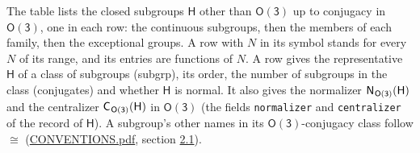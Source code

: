 \documentclass[10pt,a4paper]{article}
\numberwithin{equation}{section}
\newcommand{\grp}[1]{\mathsf{#1}}
\newcommand{\samecls}{\cong}
\newcommand{\hairsp}{\mkern1mu}
\begin{document}
\leavevmode\label{n:group.H}The table lists the closed subgroups $\grp{H}$ other than $\grp{O(3)}$ up to conjugacy in $\grp{O(3)}$, one in each row: the continuous subgroups, then the members of each family, then the exceptional groups. A row with $N$ in its symbol stands for every $N$ of its range, and its entries are functions of $N$. \label{n:head.subgroup}\label{n:head.order}\label{n:head.conjugates}\label{n:head.normal}A row gives the representative $\grp{H}$ of a class of subgroups (subgrp), its order, the number of subgroups in the class (conjugates) and whether $\grp{H}$ is normal. \label{n:group.normalizer}\label{n:group.centralizer}It also gives the normalizer $\grp{N}_{\hairsp \grp{O(3)}}(\grp{H})$ and the centralizer $\grp{C}_{\hairsp \grp{O(3)}}(\grp{H})$ in $\grp{O(3)}$ (the fields \texttt{normalizer} and \texttt{centralizer} of the record of $\grp{H}$). A subgroup's other names in its \href{O3.pdf}{$\grp{O(3)}$}-conjugacy class follow $\samecls$ (\href{../../CONVENTIONS.pdf}{CONVENTIONS.pdf}, section \href{../../CONVENTIONS.pdf\#conv.2.1}{2.1}).
\end{document}
